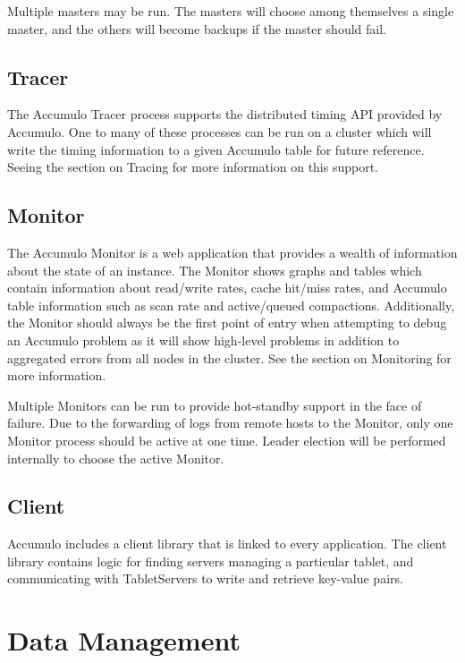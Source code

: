 Multiple masters may be run. The masters will choose among themselves a single master,
and the others will become backups if the master should fail.

\subsection{Tracer}

The Accumulo Tracer process supports the distributed timing API provided by Accumulo.
One to many of these processes can be run on a cluster which will write the timing
information to a given Accumulo table for future reference. Seeing the section on
Tracing for more information on this support.

\subsection{Monitor}

The Accumulo Monitor is a web application that provides a wealth of information about
the state of an instance. The Monitor shows graphs and tables which contain information
about read/write rates, cache hit/miss rates, and Accumulo table information such as scan
rate and active/queued compactions. Additionally, the Monitor should always be the first
point of entry when attempting to debug an Accumulo problem as it will show high-level problems
in addition to aggregated errors from all nodes in the cluster. See the section on Monitoring
for more information.

Multiple Monitors can be run to provide hot-standby support in the face of failure. Due to the
forwarding of logs from remote hosts to the Monitor, only one Monitor process should be active
at one time. Leader election will be performed internally to choose the active Monitor.

\subsection{Client}

Accumulo includes a client library that is linked to every application. The client
library contains logic for finding servers managing a particular tablet, and
communicating with TabletServers to write and retrieve key-value pairs.

\section{Data Management}

